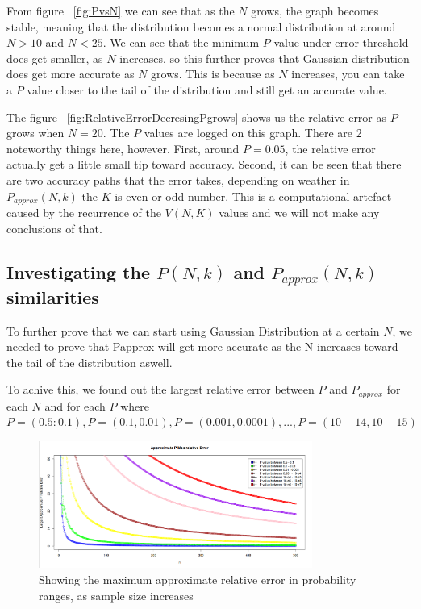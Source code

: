 \documentclass[12pt]{article}
\begin{document}
From figure ~\ref{fig:PvsN} we can see that as the $N$ grows, the graph becomes stable, meaning that the distribution becomes a normal distribution at around $N > 10$ and $N < 25$. We can see that the minimum $P$ value under error threshold does get smaller, as $N$ increases, so this further proves that Gaussian distribution does get more accurate as $N$ grows. This is because as $N$ increases, you can take a $P$ value closer to the tail of the distribution and still get an accurate value.

The figure ~\ref{fig:RelativeErrorDecresingPgrows} shows us the relative error as $P$ grows when $N = 20$. The $P$ values are logged on this graph. There are 2 noteworthy things here, however. First, around $P = 0.05$, the relative error actually get a little small tip toward accuracy. Second, it can be seen that there are two accuracy paths that the error takes, depending on weather in $P_{approx}(N, k)$  the $K$ is even or odd number. This is a computational artefact caused by the recurrence of the $V(N, K)$ values and we will not make any conclusions of that.

\subsection{Investigating the $P(N, k)$ and $P_{approx}(N, k)$ similarities}
To further prove that we can start using Gaussian Distribution at a certain $N$, we needed to prove that Papprox will get more accurate as the N increases toward the tail of the distribution aswell.

To achive this, we found out the largest relative error between $P$ and $P_{approx}$ for each $N$ and for each $P$ where $P = (0.5:0.1), P = (0.1, 0.01), P = (0.001, 0.0001), ... , P = (10-14 , 10-15)$

\begin{figure}
	\centering
  \includegraphics[width=0.8\textwidth]{LargestApproxPRelativeError3}
	\caption{Showing the maximum approximate relative error in probability ranges, as sample size increases}
	\label{fig:LargestApproxPRelativeError}
\end{figure}
\end{document}
